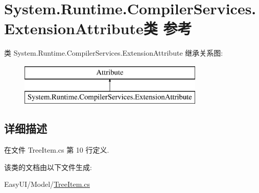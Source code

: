 \hypertarget{class_system_1_1_runtime_1_1_compiler_services_1_1_extension_attribute}{\section{System.\-Runtime.\-Compiler\-Services.\-Extension\-Attribute类 参考}
\label{class_system_1_1_runtime_1_1_compiler_services_1_1_extension_attribute}
}
类 System.\-Runtime.\-Compiler\-Services.\-Extension\-Attribute 继承关系图\-:\begin{figure}[H]
\begin{center}
\leavevmode
\includegraphics[height=2.000000cm]{class_system_1_1_runtime_1_1_compiler_services_1_1_extension_attribute}
\end{center}
\end{figure}


\subsection{详细描述}


在文件 Tree\-Item.\-cs 第 10 行定义.



该类的文档由以下文件生成\-:\begin{DoxyCompactItemize}
\item 
Easy\-U\-I/\-Model/\hyperlink{_tree_item_8cs}{Tree\-Item.\-cs}\end{DoxyCompactItemize}
